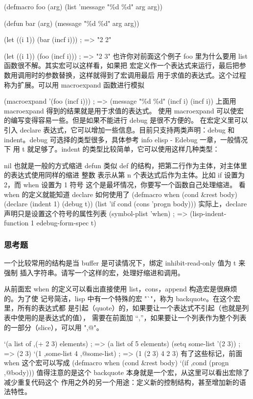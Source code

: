 \documentclass[11pt]{ctexart}
\begin{document}
{{{{(defmacro foo (arg)
(list 'message "\%d \%d" arg arg))

(defun bar (arg)
(message "\%d \%d" arg arg))

(let ((i 1))
(bar (incf i)))                       ; => "2 2"

(let ((i 1))
(foo (incf i)))                       ; => "2 3"
也许你对前面这个例子 foo 里为什么要用 list 函数很不解。其实宏可以这样看，如果把
宏定义作一个表达式来运行，最后把参数用调用时的参数替换，这样就得到了宏调用最后
用于求值的表达式。这个过程称为扩展。可以用 macroexpand 函数进行模拟

(macroexpand '(foo (incf i))) ; => (message "\%d \%d" (incf i) (incf i))
上面用 macroexpand 得到的结果就是用于求值的表达式。
使用 macroexpand 可以使宏的编写变得容易一些。但是如果不能进行 debug 是很不方便的。
在宏定义里可以引入 declare 表达式，它可以增加一些信息。目前只支持两类声明：debug
和 indent。debug 可选择的类型很多，具体参考 info elisp - Edebug 一章，一般情况下
用 t 就足够了。indent 的类型比较简单，它可以使用这样几种类型：

nil 也就是一般的方式缩进
defun 类似 def 的结构，把第二行作为主体，对主体里的表达式使用同样的缩进
整数 表示从第 n 个表达式后作为主体。比如 if 设置为 2，而 when 设置为 1
符号 这个是最坏情况，你要写一个函数自己处理缩进。
看 when 的定义就能知道 declare 如何使用了
(defmacro when (cond \&rest body)
(declare (indent 1) (debug t))
(list 'if cond (cons 'progn body)))
实际上，declare 声明只是设置这个符号的属性列表
(symbol-plist 'when)    ; => (lisp-indent-function 1 edebug-form-spec t)
\subsubsection{思考题}
\label{sec:org5d081c9}
一个比较常用的结构是当 buffer 是可读情况下，绑定 inhibit-read-only 值为 t 来强制
插入字符串。请写一个这样的宏，处理好缩进和调用。

从前面宏 when 的定义可以看出直接使用 list，cons，append 构造宏是很麻烦的。为了使
记号简洁，lisp 中有一个特殊的宏 "`"，称为 backquote。在这个宏里，所有的表达式都
是引起（quote）的，如果要让一个表达式不引起（也就是列表中使用的是表达式的值），
需要在前面加 “,”，如果要让一个列表作为整个列表的一部分（slice），可以用 ",@"。

`(a list of ,(+ 2 3) elements)          ; => (a list of 5 elements)
(setq some-list '(2 3))                 ; => (2 3)
`(1 ,some-list 4 ,@some-list)           ; => (1 (2 3) 4 2 3)
有了这些标记，前面 when 这个宏可以写成
(defmacro when (cond \&rest body)
`(if ,cond
(progn ,@body)))
值得注意的是这个 backquote 本身就是一个宏，从这里可以看出宏除了减少重复代码这个
作用之外的另一个用途：定义新的控制结构，甚至增加新的语法特性。

}}}}
\end{document}
